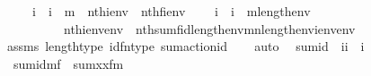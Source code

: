 \begin{isabellebody}
\ \ \ \ {\isachardoublequoteopen}{\isasymAnd}\ i\ {\isachardot}{\kern0pt}\ i\ {\isacharless}{\kern0pt}\ m\ {\isasymLongrightarrow}\ nth{\isacharparenleft}{\kern0pt}i{\isacharcomma}{\kern0pt}env{\isacharparenright}{\kern0pt}\ {\isacharequal}{\kern0pt}\ nth{\isacharparenleft}{\kern0pt}f{\isacharbackquote}{\kern0pt}i{\isacharcomma}{\kern0pt}env{\isacharprime}{\kern0pt}{\isacharparenright}{\kern0pt}{\isachardoublequoteclose}\isanewline
\ \ \ {\isachardoublequoteopen}{\isasymAnd}\ i\ {\isachardot}{\kern0pt}\ i\ {\isacharless}{\kern0pt}\ m{\isacharhash}{\kern0pt}{\isacharplus}{\kern0pt}length{\isacharparenleft}{\kern0pt}env{}{\isacharparenright}{\kern0pt}\ {\isasymLongrightarrow}\isanewline
\ \ \ \ \ \ \ \ \ \ nth{\isacharparenleft}{\kern0pt}i{\isacharcomma}{\kern0pt}env{\isacharat}{\kern0pt}env{}{\isacharparenright}{\kern0pt}\ {\isacharequal}{\kern0pt}\ nth{\isacharparenleft}{\kern0pt}sum{\isacharparenleft}{\kern0pt}f{\isacharcomma}{\kern0pt}id{\isacharparenleft}{\kern0pt}length{\isacharparenleft}{\kern0pt}env{}{\isacharparenright}{\kern0pt}{\isacharparenright}{\kern0pt}{\isacharcomma}{\kern0pt}m{\isacharcomma}{\kern0pt}n{\isacharcomma}{\kern0pt}length{\isacharparenleft}{\kern0pt}env{}{\isacharparenright}{\kern0pt}{\isacharparenright}{\kern0pt}{\isacharbackquote}{\kern0pt}i{\isacharcomma}{\kern0pt}env{\isacharprime}{\kern0pt}{\isacharat}{\kern0pt}env{}{\isacharparenright}{\kern0pt}{\isachardoublequoteclose}\isanewline
%
\isadelimproof
\ \ %
\endisadelimproof
%
\isatagproof
{}\isamarkupfalse%
\ assms\ length{\isacharunderscore}{\kern0pt}type\ id{\isacharunderscore}{\kern0pt}fn{\isacharunderscore}{\kern0pt}type\ sum{\isacharunderscore}{\kern0pt}action{\isacharunderscore}{\kern0pt}id\isanewline
\ \ \isamarkupfalse%
\ auto%
\endisatagproof
{\isafoldproof}%
%
\isadelimproof
\isanewline
%
\endisadelimproof
\isanewline
\isanewline
{}\isamarkupfalse%
\isanewline
\ \ sum{\isacharunderscore}{\kern0pt}id\ {\isacharcolon}{\kern0pt}{\isacharcolon}{\kern0pt}\ {\isachardoublequoteopen}{\isacharbrackleft}{\kern0pt}i{\isacharcomma}{\kern0pt}i{\isacharbrackright}{\kern0pt}\ {\isasymRightarrow}\ i{\isachardoublequoteclose}\ \isanewline
\ \ {\isachardoublequoteopen}sum{\isacharunderscore}{\kern0pt}id{\isacharparenleft}{\kern0pt}m{\isacharcomma}{\kern0pt}f{\isacharparenright}{\kern0pt}\ {\isasymequiv}\ sum{\isacharparenleft}{\kern0pt}{\isasymlambda}x{\isasymin}{}{\isachardot}{\kern0pt}x{\isacharcomma}{\kern0pt}f{\isacharcomma}{\kern0pt}{}{\isacharcomma}{\kern0pt}{}{\isacharcomma}{\kern0pt}m{\isacharparenright}{\kern0pt}{\isachardoublequoteclose}\isanewline

\end{isabellebody}
